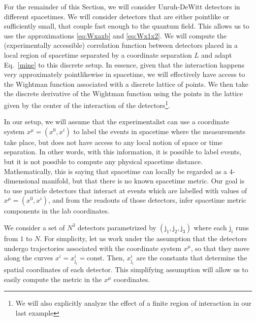 \documentclass[letterpaper,12pt,titlepage,oneside,final]{book}
\begin{document}
    For the remainder of this Section, we will consider Unruh-DeWitt detectors in different spacetimes. We will consider detectors that are either pointlike or sufficiently small, that couple fast enough to the quantum field. This allows us to use the approximations \eqref{eq:Wxaxb} and \eqref{eq:Wx1x2}. We will compute the (experimentally accessible) correlation function between detectors placed in a local region of spacetime separated by a coordinate separation $L$ and adapt Eq.~\eqref{mine} to this discrete setup. In essence, given that the interaction happens very approximately pointlikewise in spacetime, we will effectively have access to the Wightman function associated with a discrete lattice of points. We then take the discrete derivative of the Wightman function using the points in the lattice given by the center of the interaction of the detectors\footnote{We will also explicitly analyze the effect of a finite region of interaction in our last example}. 
    
    
    
    In our setup, we will assume that the experimentalist can use a coordinate system $x^\mu = (x^0,x^i)$ to label the events in spacetime where the measurements take place, but does not have access to any local notion of space or time separation. In other words, with this information, it is possible to label events, but it is not possible to compute any physical spacetime distance.  Mathematically, this is saying that spacetime can locally be regarded as a $4$-dimensional manifold, but that there is no known spacetime metric. Our goal is to use particle detectors that interact at events which are labelled with values of $x^\mu = (x^0,x^i)$, and from the readouts of those detectors, infer spacetime metric components in the lab coordinates.%
    
    
    We consider a set of $N^3$ detectors parametrized by $(\text{j}_1,\text{j}_2,\text{j}_3)$ where each $\text{j}_i$ runs from $1$ to $N$. For simplicity, let us work under the assumption that the detectors undergo trajectories associated with the coordinate system $x^\mu$, so that {they} move along the curves \mbox{$x^i = x^i_{\text{j}_i} = \text{const}$}. Then, $x^i_{\text{j}_i}$ are the constants that determine the spatial coordinates of each detector. This simplifying assumption will allow us to easily compute the metric in the $x^\mu$ coordinates. %
        
\end{document}
